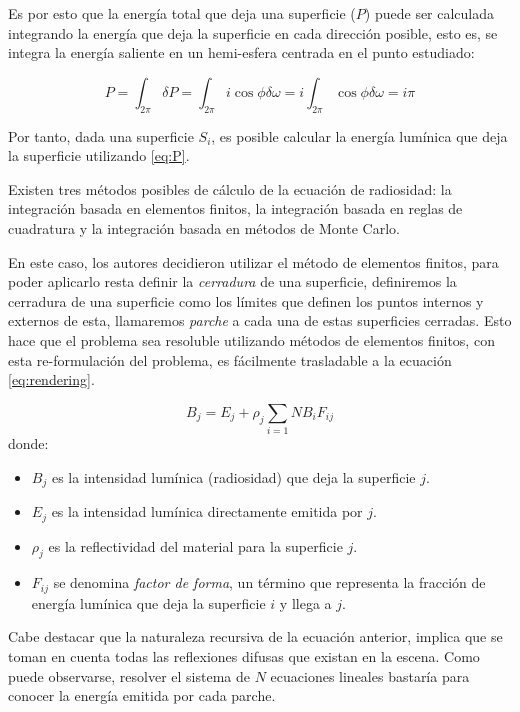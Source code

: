 Es por esto que la energía total que deja una superficie ($P$) puede ser calculada integrando la energía que deja la superficie en cada dirección posible, esto es, se integra la energía saliente en un hemi-esfera centrada en el punto estudiado:

\begin{equation}
    P = \int_{2\pi} \delta{P} = \int_{2\pi} i\cos{\phi}\delta{\omega} = i \int_{2\pi} \cos{\phi}\delta{\omega} = i\pi
    \label{eq:P}
\end{equation}

Por tanto, dada una superficie $S_{i}$, es posible calcular la energía lumínica que deja la superficie utilizando \eqref{eq:P}.

Existen tres métodos posibles de cálculo de la ecuación de radiosidad: la integración basada en elementos finitos, la integración basada en reglas de cuadratura y la integración basada en métodos de Monte Carlo.

En este caso, los autores decidieron utilizar el método de elementos finitos, para poder aplicarlo resta definir la \textit{cerradura} de una superficie, definiremos la cerradura de una superficie como los límites que definen los puntos internos y externos de esta, llamaremos \textit{parche} a cada una de estas superficies cerradas. Esto hace que el problema sea resoluble utilizando métodos de elementos finitos, con esta re-formulación del problema, es fácilmente trasladable a la ecuación \eqref{eq:rendering}.

\begin{equation}
    B_{j} = E_{j} + \rho_{j} \sum_{i=1}{N} B_{i} F_{ij} \label{eq:radiosity}
\end{equation}
donde:
\begin{itemize}
    \item $B_{j}$ es la intensidad lumínica (radiosidad) que deja la superficie $j$.
    \item $E_{j}$ es la intensidad lumínica directamente emitida por $j$.
    \item $\rho_{j}$ es la reflectividad del material para la superficie $j$.
    \item $F_{ij}$ se denomina \textit{factor de forma}, un término que representa la fracción de energía lumínica
    que deja la superficie $i$ y llega a $j$. 
\end{itemize}

Cabe destacar que la naturaleza recursiva de la ecuación anterior, implica que se toman en cuenta todas las reflexiones difusas que existan en la escena. Como puede observarse, resolver el sistema de $N$ ecuaciones lineales bastaría para conocer la energía emitida por cada parche. 

